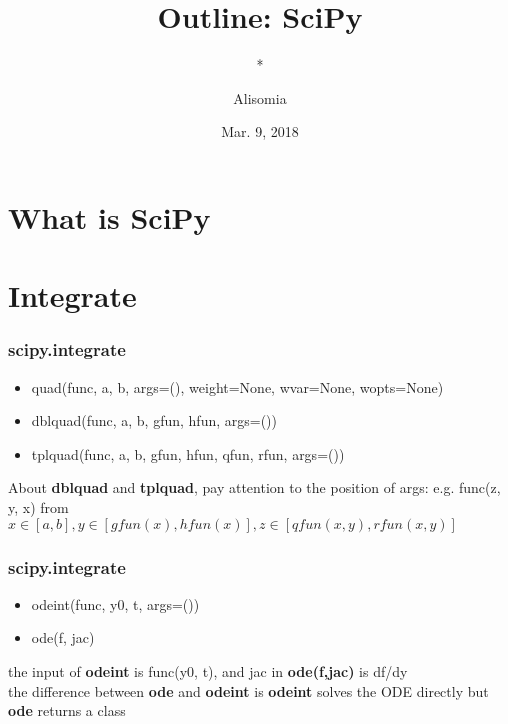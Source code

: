 \documentclass[english, nochinese]{beamer}
\title{Outline: SciPy}
\subtitle{*}
\author{Alisomia}
\date{Mar. 9, 2018}
\begin{document}
\begin{frame}
\titlepage
\end{frame}


\begin{frame}
\tableofcontents
\end{frame}


\section{What is SciPy}


\begin{frame}

\end{frame}


\section{Integrate}


\begin{frame}
\frametitle{scipy.integrate}

\begin{itemize}

\item quad(func, a, b, args=(), weight=None, wvar=None, wopts=None)
\item  dblquad(func, a, b, gfun, hfun, args=()) 
\item tplquad(func, a, b, gfun, hfun, qfun, rfun, args=())

\end{itemize}
About \textbf{dblquad} and \textbf{tplquad}, pay  attention to the position of args: e.g. func(z, y, x) from $x \in [a,b], y \in [gfun(x), hfun(x)], z \in [qfun(x, y), rfun(x, y)] $
\end{frame}

\begin{frame}
\frametitle{scipy.integrate}
\begin{itemize}
\item odeint(func, y0, t, args=())
\item ode(f, jac)
\end{itemize}
the input of \textbf{odeint} is func(y0, t), and jac in \textbf{ode(f,jac)} is df/dy\\
the difference between \textbf{ode} and \textbf{odeint} is \textbf{odeint} solves the ODE directly but \textbf{ode} returns a class
\end{frame}
\end{document}
